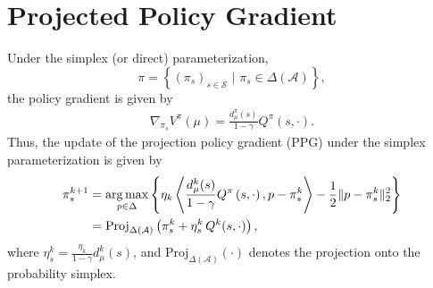 \section{Projected Policy Gradient}\label{sec:ppg}
Under the  simplex (or direct) parameterization,
$$
\pi =\left\{\left( \pi_s \right) _{s\in \mathcal{S}}\,\,|\,\, \pi_s\in \Delta \left( \mathcal{A} \right)\right\},
$$
 the policy gradient is given by \cite{pg}
\begin{align*}
    \nabla _{\pi _s}V^{\pi}\left( \mu \right) =\frac{d_{\mu}^{\pi}\left( s \right)}{1-\gamma}Q^{\pi}(s, \cdot).
\end{align*}
Thus, the update of the projection policy gradient  (PPG) under the simplex parameterization is given by
\begin{align*}
\pi^{k+1}_s &= \operatorname*{arg\,max}_{p\in\Delta}\left\{\eta_k\left\langle\frac{d_{\mu}^k(s)}{1-\gamma} Q^{\pi}\left( s,\cdot \right),p-\pi_s^k \right\rangle-\frac{1}{2}\|p-\pi_s^k\|_2^2\right\}\\
&=\mathrm{Proj}_{\Delta(\mathcal{A})}\left(\pi_s^k+\eta_s^k\,Q^k(s,\cdot)\right),
\end{align*}
where $\eta_s^k = \frac{\eta_k}{1-\gamma}d_\mu^k(s)$, and $\mathrm{Proj}_{\Delta(\mathcal{A})}\left(\cdot\right)$ denotes the projection onto the probability simplex.


